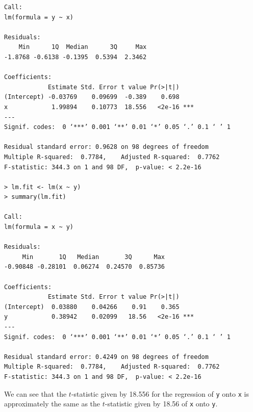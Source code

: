 \begin{itemize}
\begin{lstlisting}
Call:
lm(formula = y ~ x)

Residuals:
    Min      1Q  Median      3Q     Max
-1.8768 -0.6138 -0.1395  0.5394  2.3462

Coefficients:
            Estimate Std. Error t value Pr(>|t|)
(Intercept) -0.03769    0.09699  -0.389    0.698
x            1.99894    0.10773  18.556   <2e-16 ***
---
Signif. codes:  0 ‘***’ 0.001 ‘**’ 0.01 ‘*’ 0.05 ‘.’ 0.1 ‘ ’ 1

Residual standard error: 0.9628 on 98 degrees of freedom
Multiple R-squared:  0.7784,    Adjusted R-squared:  0.7762
F-statistic: 344.3 on 1 and 98 DF,  p-value: < 2.2e-16

> lm.fit <- lm(x ~ y)
> summary(lm.fit)

Call:
lm(formula = x ~ y)

Residuals:
     Min       1Q   Median       3Q      Max
-0.90848 -0.28101  0.06274  0.24570  0.85736

Coefficients:
            Estimate Std. Error t value Pr(>|t|)
(Intercept)  0.03880    0.04266    0.91    0.365
y            0.38942    0.02099   18.56   <2e-16 ***
---
Signif. codes:  0 ‘***’ 0.001 ‘**’ 0.01 ‘*’ 0.05 ‘.’ 0.1 ‘ ’ 1

Residual standard error: 0.4249 on 98 degrees of freedom
Multiple R-squared:  0.7784,    Adjusted R-squared:  0.7762
F-statistic: 344.3 on 1 and 98 DF,  p-value: < 2.2e-16
        \end{lstlisting}
        We can see that the $t$-statistic given by 18.556 for the
        regression of \verb|y|
        onto \verb|x| is approximately the same as the $t$-statistic
        given by 18.56 of
        \verb|x| onto \verb|y|.
\end{itemize}
